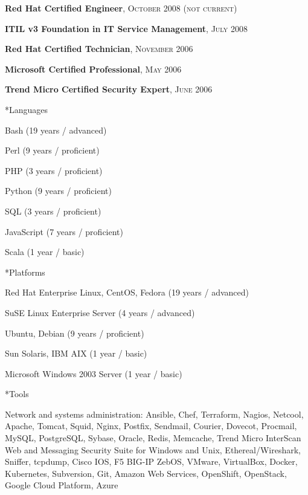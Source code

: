 \documentclass[10pt, a4paper, final]{article}
\begin{document}
\begin{section}
\begin{subsection}
\begin{compactitem}
      \item \textbf{Red Hat Certified Engineer}, \textsc{October 2008 (not current)}
      \item \textbf{ITIL v3 Foundation in IT Service Management}, \textsc{July 2008}
      \item \textbf{Red Hat Certified Technician}, \textsc{November 2006}
      \item \textbf{Microsoft Certified Professional}, \textsc{May 2006}
      \item \textbf{Trend Micro Certified Security Expert}, \textsc{June 2006}
    \end{compactitem}
  \end{subsection}
  \vspace{1em}
  \begin{subsection}*{Languages}
    \begin{compactitem}
      \item Bash (19 years / advanced) 
      \item Perl (9 years / proficient) 
      \item PHP (3 years / proficient) 
      \item Python (9 years / proficient) 
      \item SQL (3 years / proficient) 
      \item JavaScript (7 years / proficient) 
      \item Scala (1 year / basic) 
    \end{compactitem}
  \end{subsection}
  \vspace{1em}
  \begin{subsection}*{Platforms}
    \begin{compactitem}
      \item Red Hat Enterprise Linux, CentOS, Fedora (19 years / advanced) 
      \item SuSE Linux Enterprise Server (4 years / advanced) 
      \item Ubuntu, Debian (9 years / proficient) 
      \item Sun Solaris, IBM AIX (1 year / basic) 
      \item Microsoft Windows 2003 Server (1 year / basic) 
    \end{compactitem}
  \end{subsection}
  \vspace{1em}
  \begin{subsection}*{Tools}
    \begin{compactitem}
      \item Network and systems administration: Ansible, Chef, Terraform, Nagios, Netcool, Apache, Tomcat, Squid, Nginx, Postfix, Sendmail, Courier, Dovecot, Procmail, MySQL, PostgreSQL, Sybase, Oracle, Redis, Memcache, Trend Micro InterScan Web and Messaging Security Suite for Windows and Unix, Ethereal/Wireshark, Sniffer, tcpdump, Cisco IOS, F5 BIG-IP ZebOS, VMware, VirtualBox, Docker, Kubernetes, Subversion, Git, Amazon Web Services, OpenShift, OpenStack, Google Cloud Platform, Azure

\end{compactitem}
\end{subsection}
\end{section}
\end{document}
